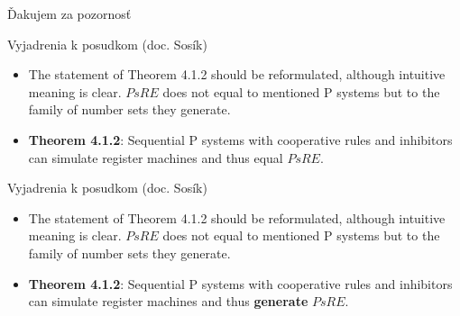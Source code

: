 \begin{frame}[plain]
\begin{center}
  \Huge Ďakujem za pozornosť
\end{center}
\end{frame}

\begin{frame}[t]{Vyjadrenia k posudkom (doc. Sosík)}
  \begin{itemize}
    \item The statement of Theorem 4.1.2 should be reformulated, although intuitive meaning is clear. $PsRE$ does not equal to mentioned P systems but to the family of number sets they generate.
    \item {\bf Theorem 4.1.2}: Sequential P systems with cooperative rules and inhibitors can simulate register machines and thus equal $PsRE$.
  \end{itemize}
\end{frame}

\begin{frame}[t]{Vyjadrenia k posudkom (doc. Sosík)}
  \begin{itemize}
    \item The statement of Theorem 4.1.2 should be reformulated, although intuitive meaning is clear. $PsRE$ does not equal to mentioned P systems but to the family of number sets they generate.
    \item {\bf Theorem 4.1.2}: Sequential P systems with cooperative rules and inhibitors can simulate register machines and thus {\bf generate} $PsRE$.
  \end{itemize}
\end{frame}

